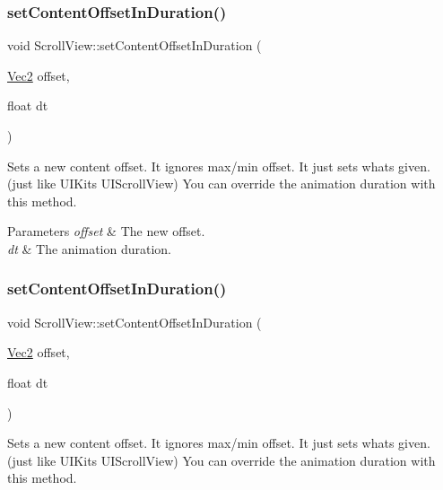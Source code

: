 \subsubsection{\texorpdfstring{set\+Content\+Offset\+In\+Duration()}{setContentOffsetInDuration()}\hspace{0.1cm}{\footnotesize\ttfamily [1/2]}}
{\footnotesize\ttfamily void Scroll\+View\+::set\+Content\+Offset\+In\+Duration (\begin{DoxyParamCaption}\item[{\hyperlink{classVec2}{Vec2}}]{offset,  }\item[{float}]{dt }\end{DoxyParamCaption})}

Sets a new content offset. It ignores max/min offset. It just sets what\textquotesingle{}s given. (just like U\+I\+Kit\textquotesingle{}s U\+I\+Scroll\+View) You can override the animation duration with this method.


\begin{DoxyParams}{Parameters}
{\em offset} & The new offset. \\
\hline
{\em dt} & The animation duration. \\
\hline
\end{DoxyParams}
\mbox{\label{classScrollView_ad98397d42075b810de17c35eb9843ec7}} 
\subsubsection{\texorpdfstring{set\+Content\+Offset\+In\+Duration()}{setContentOffsetInDuration()}\hspace{0.1cm}{\footnotesize\ttfamily [2/2]}}
{\footnotesize\ttfamily void Scroll\+View\+::set\+Content\+Offset\+In\+Duration (\begin{DoxyParamCaption}\item[{\hyperlink{classVec2}{Vec2}}]{offset,  }\item[{float}]{dt }\end{DoxyParamCaption})}

Sets a new content offset. It ignores max/min offset. It just sets what\textquotesingle{}s given. (just like U\+I\+Kit\textquotesingle{}s U\+I\+Scroll\+View) You can override the animation duration with this method.


